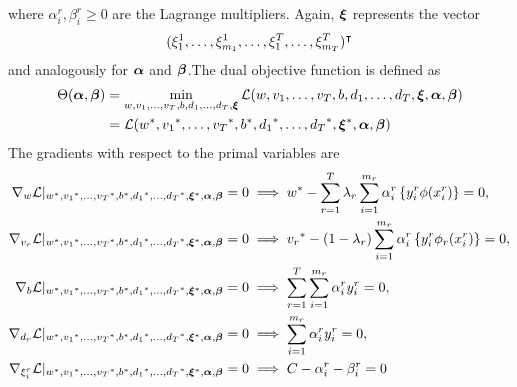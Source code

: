 where $\alpha_i^r, \beta_i^r \geq 0$ are the Lagrange multipliers. Again, $\bm{\xi}$ represents the vector $$(\xi_1^1, \ldots, \xi_{m_1}^1, \ldots, \xi_1^T, \ldots, \xi_{m_T}^T)^\intercal$$ and analogously for $\bm{\alpha}$ and $\bm{\beta}$.The dual objective function is defined as 
\begin{equation}\nonumber
    \begin{aligned}
         \Theta(\bm{\alpha}, \bm{\beta}) &=  \min_{{w}, {v}_1, \ldots, {v}_T, b, d_1, \ldots, d_T, \bm{\xi}} \mathcal{L}({w}, {v}_1, \ldots, {v}_T, b, d_1, \ldots, d_T, \bm{\xi}, \bm{\alpha}, \bm{\beta}) \\
         &= \mathcal{L}({{w}}^*, {{v}_1}^*, \ldots, {{v}_T}^*, {b}^*, {d_1}^*, \ldots, {d_T}^*, {\bm{\xi}}^*, \bm{\alpha}, \bm{\beta})
    \end{aligned}    
\end{equation}
The gradients with respect to the primal variables are
\begin{align}
    \grad_{{w}} \lagr \vert_{\optim{{w}}, \optim{{v}_1}, \ldots, \optim{{v}_\ntasks}, \optim{b}, \optim{d_1}, \ldots, \optim{d_\ntasks}, \optim{\fv{\xi}}, {\fv{\alpha}}, {\fv{\beta}}} = 0  &\implies \optim{{w}} - \sum_{r= 1}^\ntasks \lambda_r \sum_{i=1}^{m_r} {\alpha_i^r} \left\lbrace y_i^r \phi(x_i^r) \right\rbrace = 0 , \label{eq:common_repr_conv} \\
    \grad_{{v}_r} \lagr \vert_{\optim{{w}}, \optim{{v}_1}, \ldots, \optim{{v}_\ntasks}, \optim{b}, \optim{d_1}, \ldots, \optim{d_\ntasks}, \optim{\fv{\xi}}, {\fv{\alpha}}, {\fv{\beta}}} = 0 &\implies \optim{{v}_r} - (1 - \lambda_r) \sum_{i=1}^{m_r} {\alpha_i^r} \left\lbrace y_i^r \phi_r(x_i^r) \right\rbrace = 0 , \label{eq:specific_repr_conv} \\
    \grad_{b} \lagr \vert_{\optim{{w}}, \optim{{v}_1}, \ldots, \optim{{v}_\ntasks}, \optim{b}, \optim{d_1}, \ldots, \optim{d_\ntasks}, \optim{\fv{\xi}}, {\fv{\alpha}}, {\fv{\beta}}} = 0  &\implies \sum_{r= 1}^T \sum_{i=1}^{m_r} {\alpha_i^r} y_i^r = 0 , \label{eq:specific_eqconstr_conv}  \\
    \grad_{{d}_r} \lagr \vert_{\optim{{w}}, \optim{{v}_1}, \ldots, \optim{{v}_\ntasks}, \optim{b}, \optim{d_1}, \ldots, \optim{d_\ntasks}, \optim{\fv{\xi}}, {\fv{\alpha}}, {\fv{\beta}}} = 0 &\implies \sum_{i=1}^{m_r} {\alpha_i^r} y_i^r = 0 , \label{eq:common_eqconstr_conv} \\
    \grad_{\xi_i^r} \lagr \vert_{\optim{{w}}, \optim{{v}_1}, \ldots, \optim{{v}_\ntasks}, \optim{b}, \optim{d_1}, \ldots, \optim{d_\ntasks}, \optim{\fv{\xi}}, {\fv{\alpha}}, {\fv{\beta}}} = 0 &\implies C - {\alpha_i^r} - {\beta_i^r} = 0 \label{eq:xi_feas_conv}
\end{align}
